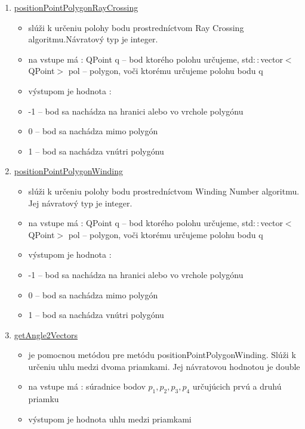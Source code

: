 \documentclass[12pt]{article}
\begin{document}
\begin{enumerate}
\item[] \underline{positionPointPolygonRayCrossing}
\begin{itemize}
\item slúži k určeniu polohy bodu prostredníctvom Ray Crossing algoritmu.Návratový typ je integer.

\item na vstupe má : QPoint q -- bod ktorého polohu určujeme, std$::$vector$<$QPoint$>$ pol -- polygon, voči ktorému určujeme polohu bodu q  

\item výstupom je hodnota :
\item[] -1 – bod sa nachádza na hranici alebo vo vrchole polygónu
\item[] 0 – bod sa nachádza mimo polygón
\item[] 1 – bod sa nachádza vnútri polygónu

\end{itemize}
\item[] \underline{positionPointPolygonWinding}
\begin{itemize}
\item slúži k určeniu polohy bodu prostredníctvom Winding Number algoritmu. Jej návratový typ je integer.
\item na vstupe má : QPoint q – bod ktorého polohu určujeme, std$::$vector$<$QPoint$>$ pol – polygon, voči ktorému určujeme polohu bodu q
\item výstupom je hodnota :
\item[] -1 – bod sa nachádza na hranici alebo vo vrchole polygónu
\item[] 0 – bod sa nachádza mimo polygón
\item[] 1 – bod sa nachádza vnútri polygónu
\end{itemize}

\item[] \underline{getAngle2Vectors}
\begin{itemize}
\item je pomocnou metódou pre metódu positionPointPolygonWinding. Slúži k určeniu uhlu medzi dvoma priamkami. Jej návratovou hodnotou je double
\item na vstupe má : súradnice bodov $p_1, p_2, p_3, p_4$ určujúcich prvú a druhú priamku
\item výstupom je hodnota uhlu medzi priamkami 
\end{itemize}


\end{enumerate}
\end{document}
